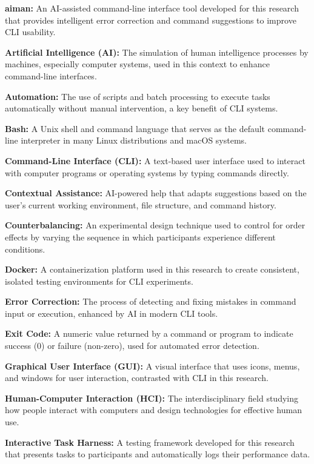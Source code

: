 \textbf{aiman:} An AI-assisted command-line interface tool developed for this research that provides intelligent error correction and command suggestions to improve CLI usability.

\textbf{Artificial Intelligence (AI):} The simulation of human intelligence processes by machines, especially computer systems, used in this context to enhance command-line interfaces.

\textbf{Automation:} The use of scripts and batch processing to execute tasks automatically without manual intervention, a key benefit of CLI systems.

\textbf{Bash:} A Unix shell and command language that serves as the default command-line interpreter in many Linux distributions and macOS systems.

\textbf{Command-Line Interface (CLI):} A text-based user interface used to interact with computer programs or operating systems by typing commands directly.

\textbf{Contextual Assistance:} AI-powered help that adapts suggestions based on the user's current working environment, file structure, and command history.

\textbf{Counterbalancing:} An experimental design technique used to control for order effects by varying the sequence in which participants experience different conditions.

\textbf{Docker:} A containerization platform used in this research to create consistent, isolated testing environments for CLI experiments.

\textbf{Error Correction:} The process of detecting and fixing mistakes in command input or execution, enhanced by AI in modern CLI tools.

\textbf{Exit Code:} A numeric value returned by a command or program to indicate success (0) or failure (non-zero), used for automated error detection.

\textbf{Graphical User Interface (GUI):} A visual interface that uses icons, menus, and windows for user interaction, contrasted with CLI in this research.

\textbf{Human-Computer Interaction (HCI):} The interdisciplinary field studying how people interact with computers and design technologies for effective human use.

\textbf{Interactive Task Harness:} A testing framework developed for this research that presents tasks to participants and automatically logs their performance data.

